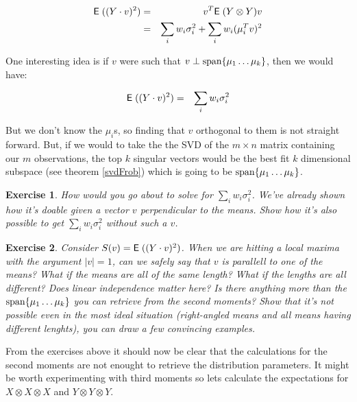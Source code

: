 \documentclass{book}
\newtheorem{exercise}{Exercise}
\numberwithin{exercise}{chapter}
\begin{document}
\begin{eqnarray*}
  \hbox{{\sf E}\;}( (Y \cdot v)^2 )
  &=& v^T \hbox{{\sf E}\;}(Y \otimes Y) v \\
  &=& \sum_i w_i \sigma_i^2 + \sum_i w_i (\mu_i^T v)^2
\end{eqnarray*}

One interesting idea is if $v$ were such that $v \perp \hbox{span}\{\mu_1 \dots
\mu_k\}$, then we would have:

\begin{eqnarray*}
  \hbox{{\sf E}\;}( (Y \cdot v)^2 )
  &=& \sum_i w_i \sigma_i^2
\end{eqnarray*}

But we don't know the $\mu_i$s, so finding that $v$ orthogonal to them
is not straight forward. But, if we would to take the the SVD of the $m
\times n$ matrix containing our $m$ observations, the top $k$ singular
vectors would be the best fit $k$ dimensional subspace (see theorem
\ref{svdFrob}) which is going to be $\hbox{span}\{\mu_1 \dots \mu_k\}$.

\begin{exercise}\label{ex:svd-gives-sigma}
  How would you go about to solve for $\sum_i w_i \sigma_i^2$. We've
  already shown how it's doable given a vector $v$ perpendicular to the
  means.  Show how it's also possible to get $\sum_i w_i \sigma_i^2$ without such a $v$.
\end{exercise}

\begin{exercise}\label{ex:second-moment-not-enough}
  Consider $S(v) = \hbox{{\sf E}\;}( (Y \cdot v)^2 )$. When we are hitting a local
  maxima with the argument $|v| = 1$, can we safely say that $v$ is
  parallell to one of the means? What if the means are all of the same
  length? What if the lengths are all different? Does linear
  independence matter here? Is there anything more than the
  $\hbox{span}\{\mu_1 \dots \mu_k\}$ you can retrieve from the second moments?
  Show that it's not possible even in the most ideal situation
  (right-angled means and all means having different lenghts), you can
  draw a few convincing examples.
\end{exercise}

From the exercises above it should now be clear that the calculations
for the second moments are not enought to retrieve the distribution
parameters. It might be worth experimenting with third moments so lets
calculate the expectations for $X \otimes X \otimes X$ and
$Y \otimes Y \otimes Y$.

\end{document}
